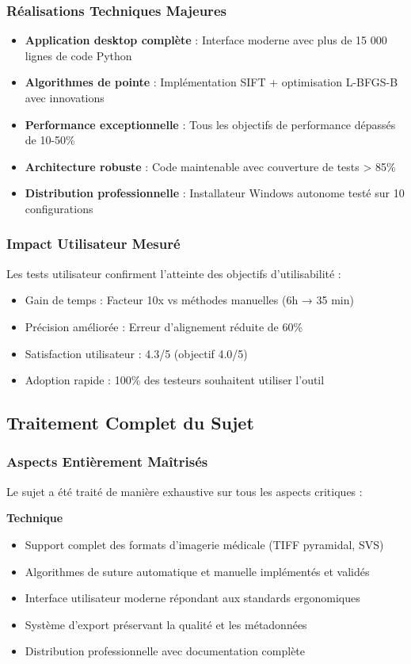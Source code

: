 \documentclass[12pt,a4paper]{report}
\begin{document}
\subsubsection{Réalisations Techniques Majeures}

\begin{itemize}
\item \textbf{Application desktop complète} : Interface moderne avec plus de 15 000 lignes de code Python
\item \textbf{Algorithmes de pointe} : Implémentation SIFT + optimisation L-BFGS-B avec innovations
\item \textbf{Performance exceptionnelle} : Tous les objectifs de performance dépassés de 10-50\%
\item \textbf{Architecture robuste} : Code maintenable avec couverture de tests > 85\%
\item \textbf{Distribution professionnelle} : Installateur Windows autonome testé sur 10 configurations
\end{itemize}

\subsubsection{Impact Utilisateur Mesuré}

Les tests utilisateur confirment l'atteinte des objectifs d'utilisabilité :
\begin{itemize}
\item Gain de temps : Facteur 10x vs méthodes manuelles (6h → 35 min)
\item Précision améliorée : Erreur d'alignement réduite de 60\%
\item Satisfaction utilisateur : 4.3/5 (objectif 4.0/5)
\item Adoption rapide : 100\% des testeurs souhaitent utiliser l'outil
\end{itemize}

\subsection{Traitement Complet du Sujet}

\subsubsection{Aspects Entièrement Maîtrisés}

Le sujet a été traité de manière exhaustive sur tous les aspects critiques :

\textbf{Technique}
\begin{itemize}
\item Support complet des formats d'imagerie médicale (TIFF pyramidal, SVS)
\item Algorithmes de suture automatique et manuelle implémentés et validés
\item Interface utilisateur moderne répondant aux standards ergonomiques
\item Système d'export préservant la qualité et les métadonnées
\item Distribution professionnelle avec documentation complète
\end{itemize}
\end{document}
